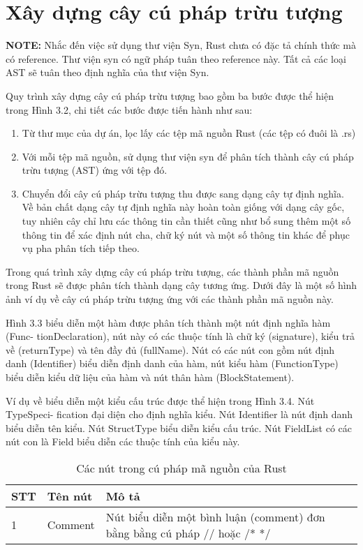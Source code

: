 \section{Xây dựng cây cú pháp trừu tượng}

\textbf{NOTE:} Nhắc đến việc sử dụng thư viện Syn, Rust chưa có đặc tả chính thức mà có reference. Thư viện syn có ngữ pháp tuân theo reference này. Tất cả các loại AST sẽ tuân theo định nghĩa của thư viện Syn.

Quy trình xây dựng cây cú pháp trừu tượng bao gồm ba bước được thể hiện trong
Hình 3.2, chi tiết các bước được tiến hành như sau:

\begin{enumerate}
  \item Từ thư mục của dự án, lọc lấy các tệp mã nguồn Rust (các tệp có đuôi là .rs)
  \item Với mỗi tệp mã nguồn, sử dụng thư viện syn để phân tích thành cây cú pháp trừu tượng (AST) ứng với tệp đó.
  \item Chuyển đổi cây cú pháp trừu tượng thu được sang dạng cây tự định nghĩa. Về bản chất dạng cây tự định nghĩa này hoàn toàn giống với dạng cây gốc, tuy nhiên cây chỉ lưu các thông tin cần thiết cũng như bổ sung thêm một số thông tin để xác định nút cha, chữ ký nút và một số thông tin khác để phục vụ pha phân tích tiếp theo.
\end{enumerate}

Trong quá trình xây dựng cây cú pháp trừu tượng, các thành phần mã nguồn trong
Rust sẽ được phân tích thành dạng cây tương ứng. Dưới đây là một số hình ảnh ví dụ về
cây cú pháp trừu tượng ứng với các thành phần mã nguồn này.

Hình 3.3 biểu diễn một hàm được phân tích thành một nút định nghĩa hàm (Func-
tionDeclaration), nút này có các thuộc tính là chữ ký (signature), kiểu trả về (returnType)
và tên đầy đủ (fullName). Nút có các nút con gồm nút định danh (Identifier) biểu diễn
định danh của hàm, nút kiểu hàm (FunctionType) biểu diễn kiểu dữ liệu của hàm và nút
thân hàm (BlockStatement).

Ví dụ về biểu diễn một kiểu cấu trúc được thể hiện trong Hình 3.4. Nút TypeSpeci-
fication đại diện cho định nghĩa kiểu. Nút Identifier là nút định danh biểu diễn tên kiểu.
Nút StructType biểu diễn kiểu cấu trúc. Nút FieldList có các nút con là Field biểu diễn các thuộc tính của kiểu này.

\begin{table}[h]
\caption{Các nút trong cú pháp mã nguồn của Rust}
\label{table:nodeastrust}
  \begin{tabularx}{\textwidth}{|l|l|X|}
\hline
\textbf{STT} & \textbf{Tên nút} & \textbf{Mô tả} \\
\hline
1 & Comment & Nút biểu diễn một bình luận (comment) đơn bằng bằng cú pháp // hoặc /* */ \\
\hline
\end{tabularx}
\end{table}
